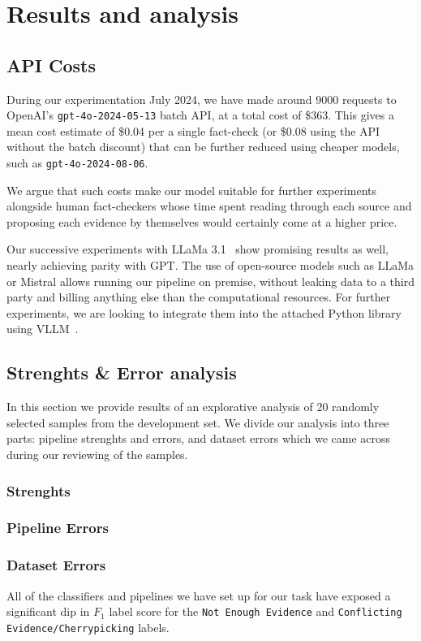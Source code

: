 
\section{Results and analysis}
\label{sec:results}



\subsection{API Costs}
During our experimentation July 2024, we have made around 9000 requests to OpenAI's \texttt{gpt-4o-2024-05-13} batch API, at a total cost of \$363.
This gives a mean cost estimate of \$0.04 per a single fact-check (or \$0.08 using the API without the batch discount) that can be further reduced using cheaper models, such as \texttt{gpt-4o-2024-08-06}.

We argue that such costs make our model suitable for further experiments alongside human fact-checkers whose time spent reading through each source and proposing each evidence by themselves would certainly come at a higher price.

Our successive experiments with LLaMa 3.1~\cite{meta2024llama31} show promising results as well, nearly achieving parity with GPT.
The use of open-source models such as LLaMa or Mistral allows running our pipeline on premise, without leaking data to a third party and billing anything else than the computational resources.
For further experiments, we are looking to integrate them into the attached Python library using VLLM~\cite{vllm}.

\subsection{Strenghts \& Error analysis}
In this section we provide results of an explorative analysis of 20 randomly selected samples from the development set. We divide our analysis into three parts: pipeline strenghts and errors, and dataset errors which we came across during our reviewing of the samples.

\subsubsection*{Strenghts}
\todo{}
\subsubsection*{Pipeline Errors}
\subsubsection*{Dataset Errors}

All of the classifiers and pipelines we have set up for our task have exposed a significant dip in $F_1$ label score for the \texttt{Not Enough Evidence} and \texttt{Conflicting Evidence/Cherrypicking} labels.


